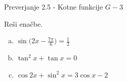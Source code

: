\documentclass[a4paper,12pt]{letter}
\newcommand{\ds}{\displaystyle}
\renewcommand{\headrulewidth}{3pt}
\renewcommand{\headrulewidth}{0.3pt}
\newcounter{tocke}
\begin{document}
\pagestyle{fancy}
\renewcommand\headrulewidth{0pt}
\lhead{}\chead{}\rhead{}
\rfoot{\vspace*{-2\baselineskip}}
\renewcommand{\vec}{\overrightarrow}
\def\programletnik{G-3}
\def\naslov{Preverjanje 2.5 - }
\def\sklop{Kotne funkcije}
\def\tockeA{2+2+3}
\def\tockeB{2+2}
\def\tockeC{2+3}
\def\tockeD{2+3}
\def\tockeE{1+1+1+1+1+1}
\def\tockeF{2+2+3}
\begin{minipage}{20cm}
\begin{bclogo}[couleur=brown!30,
  arrondi=0,ombre=true, couleurOmbre=gray!50,
logo =\bcplume,
  noborder=true]
{\textrm{{\Large{\naslov \sklop} \Huge{}
\large{} \hfill $\programletnik$}}}
\end{bclogo}
\end{minipage}
\begin{minipage}{20cm}
\begin{bclogo}[couleur=brown!30,
  arrondi=0,ombre=true, couleurOmbre=gray!50,
logo =\bcplume,
  noborder=true]
{\textrm{{}}}
\end{bclogo}
\end{minipage}

\begin{naloga}[\hfill $\tockeA$] \addtocounter{tocke}{\numexpr\tockeA\relax}
Re\v{s}i ena\v{c}be.
\begin{enumerate}[a)]
\item $\ds\sin\Big(2x-\frac{7\pi}{6}\Big)=\frac12$
\item $\ds\tan^2x+\tan x=0$
\item $\ds\cos2x+\sin^2x=3\cos x-2$
\end{enumerate}
\end{naloga}\newpage
\end{document}
